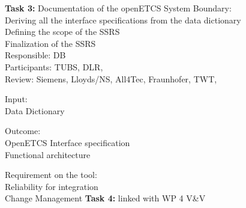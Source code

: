 \documentclass{template/openetcs_article}
\begin{document}
\textbf{Task 3:} Documentation of the openETCS System Boundary:\\
Deriving all the interface specifications from the data dictionary\\
Defining the scope of the SSRS \\
Finalization of the SSRS\\
Responsible: DB\\
Participants: TUBS, DLR,\\ 
Review: Siemens, Lloyds/NS, All4Tec, Fraunhofer, TWT,

Input:\\
\hspace*{10mm}Data Dictionary

Outcome:\\
\hspace*{10mm}OpenETCS Interface specification\\
\hspace*{10mm}Functional architecture

Requirement on the tool:\\
\hspace*{10mm}Reliability for integration\\
\hspace*{10mm}Change Management
\newpage
\textbf{Task 4:} linked with WP 4 V\&V
\end{document}
